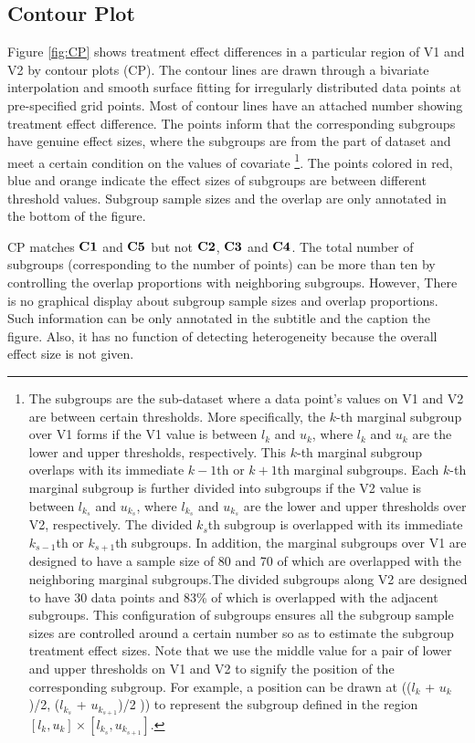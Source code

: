 \documentclass[Afour,sagev,times, doublespace]{sagej}
\begin{document}
{\subsection{Contour Plot}

Figure \ref{fig:CP} shows treatment effect differences in a particular region of V1 and V2 by contour plots (CP). The contour lines are drawn through a bivariate interpolation and smooth surface fitting for irregularly distributed data points at pre-specified grid points. Most of contour lines have an attached number showing treatment effect difference. The points inform that the corresponding subgroups have genuine effect sizes, where the subgroups are from the part of dataset and meet a certain condition on the values of covariate \footnote{The subgroups are the sub-dataset where a data point's values on V1 and V2 are between certain thresholds. More specifically, the $k$-th marginal subgroup over V1 forms if the V1 value is between $l_k$ and $u_k$, where $l_k$ and $u_k$ are the lower and upper thresholds, respectively. This $k$-th marginal subgroup overlaps with its immediate $k-1$th or $k+1$th  marginal subgroups. Each $k$-th marginal subgroup is further divided into subgroups if the V2 value is between $l_{k_s}$ and $u_{k_s}$, where $l_{k_s}$ and $u_{k_s}$ are the lower and upper thresholds over V2, respectively. The divided $k_s$th subgroup is overlapped with its immediate $k_{s-1}$th or $k_{s+1}$th subgroups. In addition, the marginal subgroups over V1 are designed to have a sample size of 80 and 70 of which are overlapped with the neighboring marginal subgroups.The divided subgroups along V2 are designed to have 30 data points and 83\% of which is overlapped with the adjacent subgroups. This configuration of subgroups ensures all the subgroup sample sizes are controlled around a certain number so as to estimate the subgroup treatment effect sizes. Note that we use the middle value for a pair of lower and upper thresholds on V1 and V2 to signify the position of the corresponding subgroup. For example, a position can be drawn at (($l_k$ + $u_k$)/2, ($l_{k_s}$ + $u_{k_{s+1}}$)/2 )) to represent the subgroup defined in the region $[l_k, u_k]\times[l_{k_s}, u_{k_{s+1}} ]$. }. The points colored in red, blue and orange indicate the effect sizes of subgroups are between different threshold values. Subgroup sample sizes and the overlap are only annotated in the bottom of the figure.


CP matches $\bf C1$ and $\bf C5$ but not $\bf C2$, $\bf C3$ and $\bf C4$. The total number of subgroups (corresponding to the number of points) can be more than ten by controlling the overlap proportions with neighboring subgroups. However,  There is no graphical display about subgroup sample sizes and overlap proportions. Such information can be only annotated in the subtitle and the caption the figure. Also, it has no function of detecting heterogeneity because the overall effect size is not given.

}
\end{document}
